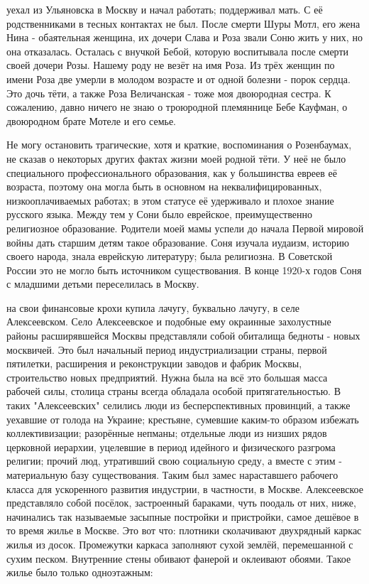\label{29-1}
уехал из Ульяновска в Москву и начал работать; поддерживал мать. С её родственниками в тесных контактах не был. После смерти Шуры Мотл, его жена Нина - обаятельная женщина, их дочери Слава и Роза звали Соню жить у них, но она отказалась. Осталась с внучкой Бебой, которую воспитывала после смерти своей дочери Розы. Нашему роду не везёт на имя Роза. Из трёх женщин по имени Роза две умерли в молодом возрасте и от одной болезни - порок сердца. Это дочь тёти, а также Роза Величанская - тоже моя двоюродная сестра. К сожалению, давно ничего не знаю о троюродной племяннице Бебе Кауфман, о двоюродном брате Мотеле и его семье.

\label{29-2}
Не могу остановить трагические, хотя и краткие, воспоминания о Розенбаумах, не сказав о некоторых других фактах жизни моей родной тёти. У неё не было специального профессионального образования, как у большинства евреев её возраста, поэтому она могла быть в основном на неквалифицированных, низкооплачиваемых работах; в этом статусе её удерживало и плохое знание русского языка. Между тем у Сони было еврейское, преимущественно религиозное образование. Родители моей мамы успели до начала Первой мировой войны дать старшим детям такое образование. Соня изучала иудаизм, историю своего народа, знала еврейскую литературу; была религиозна. В Советской России это не могло быть источником существования. В конце 1920-х годов Соня с младшими детьми переселилась в Москву.

\label{30-1}
на свои финансовые крохи купила лачугу, буквально лачугу, в селе Алексеевском. Село Алексеевское и подобные ему окраинные захолустные районы расширявшейся Москвы представляли собой обиталища бедноты - новых москвичей. Это был начальный период индустриализации страны, первой пятилетки, расширения и реконструкции заводов и фабрик Москвы, строительство новых предприятий. Нужна была на всё это большая масса рабочей силы, столица страны всегда обладала особой притягательностью. В таких "Алексеевских" селились люди из бесперспективных провинций, а также уехавшие от голода на Украине; крестьяне, сумевшие каким-то образом избежать коллективизации; разорённые непманы; отдельные люди из низших рядов церковной иерархии, уцелевшие в период идейного и физического разгрома религии; прочий люд, утративший свою социальную среду, а вместе с этим - материальную базу существования. Таким был замес нараставшего рабочего класса для ускоренного развития индустрии, в частности, в Москве. Алексеевское представляло собой посёлок, застроенный бараками, чуть поодаль от них, ниже, начинались так называемые засыпные постройки и пристройки, самое дешёвое в то время жилье в Москве. Это вот что: плотники сколачивают двухрядный каркас жилья из досок. Промежутки каркаса заполняют сухой землёй, перемешанной с сухим песком. Внутренние стены обивают фанерой и оклеивают обоями. Такое жилье было только одноэтажным:

